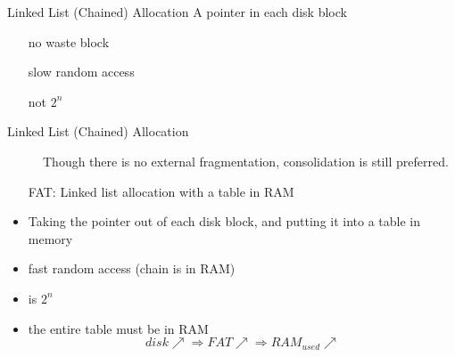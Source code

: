 \begin{frame}
  \begin{center}
  \end{center}
  \begin{block}{Linked List (Chained) Allocation}
    A pointer in each disk block
    \begin{multicols}{2}
      \begin{itemize}
      \item[\Good] no waste block
      \item[\Bad] slow random access
      \item[\Bad] not $2^n$
      \end{itemize}
    \end{multicols}
  \end{block}
\end{frame}

\begin{frame}
  \begin{description}
  \item[Linked List (Chained) Allocation] Though there is no external fragmentation,
    consolidation is still preferred.
  \end{description}
  \begin{center}
  \end{center}
\end{frame}

\begin{frame}
  \begin{itemize}
  \item[FAT:] Linked list allocation with a table in RAM
  \end{itemize}
  \begin{minipage}{.59\textwidth}
    \begin{block}{}
      \begin{itemize}
      \item Taking the pointer out of each disk block, and putting it into a table in
        memory
      \item fast random access (chain is in RAM)
      \item is $2^n$
      \item the entire table must be in RAM
        $$disk\nearrow{}\Rightarrow FAT\nearrow{}\Rightarrow RAM_{used}\nearrow$$
      \end{itemize}
    \end{block}
  \end{minipage}\quad
  \begin{minipage}{.35\textwidth}
  \end{minipage}
\end{frame}

